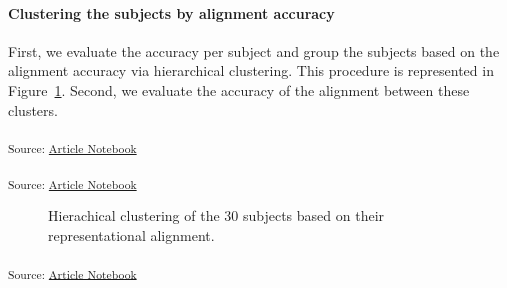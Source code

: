 \documentclass[
  authoryear]{elsarticle}
\let\oldparagraph\paragraph
\renewcommand{\paragraph}[1]{\oldparagraph{#1}\mbox{}}
\begin{document}
\paragraph{Clustering the subjects by alignment
accuracy}\label{clustering-the-subjects-by-alignment-accuracy}

First, we evaluate the accuracy per subject and group the subjects based
on the alignment accuracy via hierarchical clustering. This procedure is
represented in Figure~\ref{fig-hclust}. Second, we evaluate the accuracy
of the alignment between these clusters.

\textsubscript{Source:
\href{https://m-delem.github.io/2499-similarity-manuscript/index.qmd.html}{Article
Notebook}}

\textsubscript{Source:
\href{https://m-delem.github.io/2499-similarity-manuscript/index.qmd.html}{Article
Notebook}}

\label{cell-fig-hclust}
\begin{figure}[H]


\caption{\label{fig-hclust}Hierachical clustering of the 30 subjects
based on their representational alignment.}

\end{figure}%

\textsubscript{Source:
\href{https://m-delem.github.io/2499-similarity-manuscript/index.qmd.html}{Article
Notebook}}
\end{document}
